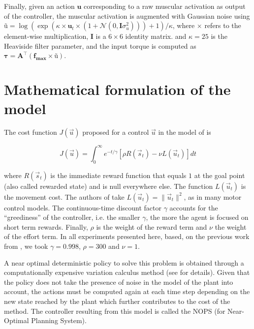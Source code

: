 \documentclass[pdftex,a4paper,11pt]{report}
\begin{document}
Finally, given an action $\textbf{u}$ corresponding to a raw muscular activation as output of the
controller, the muscular activation
is augmented with Gaussian noise using $\textbf{\~{u}} = \log(\exp(\kappa \times \textbf{u}_t \times (1+\mathcal{N}(0,\textbf{I}\sigma_u^2))) + 1) / \kappa$, where $\times$ refers to the element-wise multiplication, $\textbf{I}$ is a $6 \times 6$ identity matrix.
and $\kappa = 25$ is the Heaviside filter parameter, and the input torque 
is computed as $\boldsymbol{\tau} = \textbf{A}^\top ( \textbf{f}_\textbf{max} \times \textbf{\~{u}} )$.

\section{Mathematical formulation of the model}
\label{sec_modelformulation}

The cost function $J(\vec{u})$ proposed for a control $\vec{u}$ in the model of \cite{rigoux12_plos} is

\begin{equation}
\label{eq:criterion}
 J(\vec{u}) = \int_0^{\infty} e^{-t/\gamma} [ \rho R(\vec{s}_t) - \nu L(\vec{u}_t) ] dt
\end{equation}

where $R(\vec{s}_t)$ is the immediate reward function that equals $1$ at the goal point (also called rewarded state) and is null everywhere else. The function $L(\vec{u}_t)$ is the movement cost. The authors of \cite{rigoux12_plos} take $L(\vec{u}_t) = \|\vec{u}_t\|^2$, as in many motor control models. 
The continuous-time discount factor $\gamma$ accounts for the ``greediness'' of the controller, i.e. the smaller $\gamma$, the more the agent is focused on short term rewards.
Finally, $\rho$ is the weight of the reward term and $\nu$ the weight of the effort term.
In all experiments presented here, based, on the previous work from \cite{rigoux12_plos}, we took $\gamma=0.998$, $\rho=300$ and $\nu=1$.

A near optimal deterministic policy to solve this problem is obtained through a computationally expensive variation calculus method (see \cite{rigoux_these} for details).
Given that the policy does not take the presence of noise in the model of the plant into account, 
the actions must be computed again at each time step depending on the new state reached by the plant
which further contributes to the cost of the method.
The controller resulting from this model is called the NOPS (for Near-Optimal Planning System).
\end{document}
